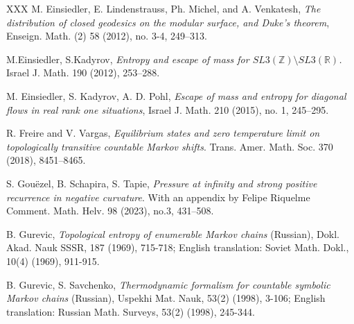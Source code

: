 \documentclass[letterpaper,11pt]{amsart}
\theoremstyle{plain}
\theoremstyle{plain}
\theoremstyle{definition}
\theoremstyle{remark}
\def\R{{\mathbb R}}
\def\Z{{\mathbb Z}}
\begin{document}
\begin{thebibliography}{XXX}
 M. Einsiedler, E. Lindenstrauss, Ph. Michel, and A. Venkatesh, \emph{The distribution of closed geodesics on the modular surface, and Duke's theorem}, Enseign. Math. (2) 58 (2012), no. 3-4, 249--313.

 M.Einsiedler, S.Kadyrov, \emph{Entropy and escape of mass for $SL3(\Z) \setminus SL3(\R)$.} Israel J. Math. 190 (2012), 253--288. 

 M. Einsiedler, S. Kadyrov, A. D. Pohl, \emph{Escape of mass and entropy for diagonal flows in real rank one situations}, Israel J. Math. 210 (2015), no. 1, 245--295.


  R. Freire and V. Vargas, \emph{Equilibrium states and zero temperature limit on topologically
transitive countable Markov shifts}. Trans. Amer. Math. Soc. 370 (2018), 8451--8465.



 S. Gou\"ezel, B. Schapira, S. Tapie, \emph{Pressure at infinity and strong positive recurrence in negative curvature}. With an appendix by Felipe Riquelme
Comment. Math. Helv. 98 (2023), no.3, 431--508.

 B. Gurevic, \emph{Topological entropy of enumerable Markov chains} (Russian), Dokl. Akad. Nauk SSSR, 187 (1969), 715-718; English translation: Soviet Math. Dokl., 10(4) (1969), 911-915.


 B. Gurevic, S. Savchenko, \emph{Thermodynamic formalism for countable symbolic Markov chains} (Russian), Uspekhi Mat. Nauk, 53(2) (1998), 3-106; English translation: Russian Math. Surveys, 53(2) (1998), 245-344.







\end{thebibliography}
\end{document}
